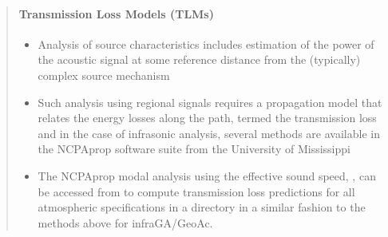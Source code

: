\documentclass[letterpaper,10pt,english]{sphinxmanual}
\begin{document}
\begin{itemize}
\begin{quote}
\begin{itemize}
\end{itemize}

\begin{sphinxVerbatim}[commandchars=\\\{\}]
   

  
    
\end{sphinxVerbatim}


\paragraph{Transmission Loss Models (TLMs)}
\label{\detokenize{propagation:transmission-loss-models-tlms}}\begin{itemize}
\item {} 
Analysis of source characteristics includes estimation of the power of the acoustic signal at some reference distance from the (typically) complex source mechanism

\item {} 
Such analysis using regional signals requires a propagation model that relates the energy losses along the path, termed the transmission loss and in the case of infrasonic analysis, several methods are available in the NCPAprop software suite from the University of Mississippi

\item {} 
The NCPAprop modal analysis using the effective sound speed, , can be accessed from  to compute transmission loss predictions for all atmospheric specifications in a directory in a similar fashion to the methods above for infraGA/GeoAc.

\end{itemize}

\begin{sphinxVerbatim}[commandchars=\\\{\}]
   


\end{sphinxVerbatim}
\end{quote}
\end{itemize}
\end{document}
